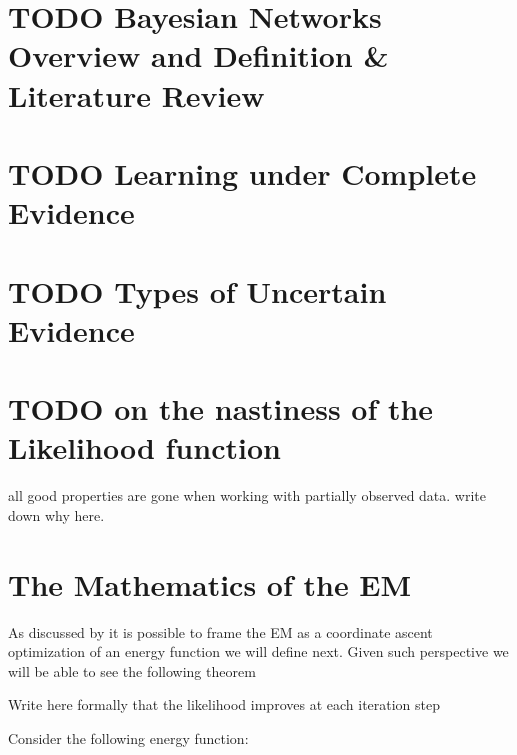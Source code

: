 \documentclass[11pt]{article}
\begin{document}
\begin{article}

\maketitle

\newpage

\tableofcontents

\newpage

\section{{\bfseries\sffamily TODO} Bayesian Networks Overview and Definition \& Literature Review}
\label{sec:org56a9b7a}

\section{{\bfseries\sffamily TODO} Learning under Complete Evidence}
\label{sec:org8d18d50}

\section{{\bfseries\sffamily TODO} Types of Uncertain Evidence}
\label{sec:org1142845}

\section{{\bfseries\sffamily TODO} on the nastiness of the Likelihood function}
\label{sec:orgc9f4478}

all good properties are gone when working with partially observed
data. write down why here. 


\section{The Mathematics of the EM}
\label{sec:org1454b51}
As discussed by \cite{koller2009probabilistic} it is possible to frame
the EM as a coordinate ascent optimization of an energy function we
will define next. Given such perspective we will be able to see the
following theorem

\begin{theorem}\label{thm:one}
Write here formally that the likelihood improves at each iteration step
\end{theorem}

Consider the following energy function:


\end{article}
\end{document}
